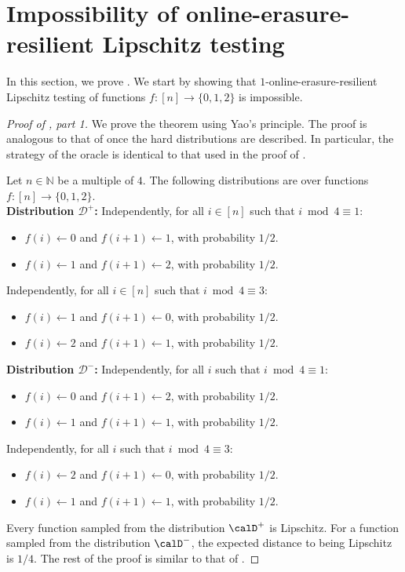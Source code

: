 \documentclass[11pt]{article}
\numberwithin{equation}{section}
\theoremstyle{definition}
\theoremstyle{plain}
\begin{document}
\section{Impossibility of online-erasure-resilient Lipschitz testing}\label{sec:lipschitz}
In this section, we prove .
%
We start by showing that $1$-online-erasure-resilient Lipschitz testing  of functions $f:[n] \to \{0,1,2\}$ is impossible. 
\begin{proof}[Proof of , part 1]
We prove the theorem using Yao's principle. The proof is analogous to that of 
once the hard distributions are described. In particular, the strategy of the oracle is identical to that used in the proof of .

Let $n \in \mathbb{N}$ be a multiple of $4$. The following distributions are over functions $f:[n] \to \{0,1,2\}$. \\


\noindent\textbf{Distribution $\mathcal{D}^+$:} Independently, for all $i \in[n]$ such that $i \bmod 4 \equiv 1$:
\begin{itemize}
    \item $f(i) \gets 0$ and $f(i+1) \gets 1$, with probability $1/2$.
    \item $f(i) \gets 1$ and $f(i+1) \gets 2$, with probability $1/2$.
\end{itemize}
Independently, for all $i \in[n]$ such that $i \bmod 4 \equiv 3$:
\begin{itemize}
    \item $f(i) \gets 1$ and $f(i+1) \gets 0$, with probability $1/2$.
    \item $f(i) \gets 2$ and $f(i+1) \gets 1$, with probability $1/2$.
\end{itemize}

\noindent\textbf{Distribution $\mathcal{D}^-$:} Independently, for all $i$ such that $i \bmod 4 \equiv 1$:
\begin{itemize}
    \item $f(i) \gets 0$ and $f(i+1) \gets 2$, with probability $1/2$.
    \item $f(i) \gets 1$ and $f(i+1) \gets 1$, with probability $1/2$.
\end{itemize}
Independently, for all $i$ such that $i \bmod 4 \equiv 3$:
\begin{itemize}
    \item $f(i) \gets 2$ and $f(i+1) \gets 0$, with probability $1/2$.
    \item $f(i) \gets 1$ and $f(i+1) \gets 1$, with probability $1/2$.
\end{itemize}

Every function sampled from the distribution  $\calD^+$ is Lipschitz. For a function sampled from the distribution $\calD^-$, the expected distance to being Lipschitz is $1/4$.
The rest of the proof is similar to that of .
\end{proof}
\end{document}
